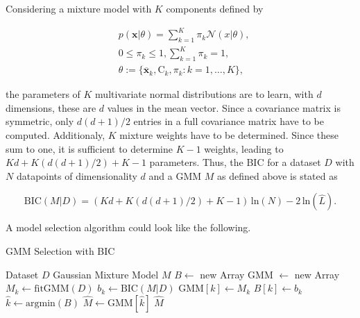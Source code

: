 \documentclass[../../../main.tex]{subfiles}
\begin{document}
Considering a mixture model with $K$ components defined by 

\begin{equation}
    \begin{aligned}
        &p(\bm{x}|\theta) = \sum\limits_{k=1}^K \pi_k \mathcal{N}(x | \theta), \\
        &0 \leq \pi_k \leq 1, \sum\limits_{k=1}^K \pi_k = 1, \\
        &\theta := \{\overline{\bm{x}}_k, \bm{\mathrm{C}}_k, \pi_k : k = 1, \dots, K \},
    \end{aligned}
\end{equation}

the parameters of $K$ multivariate normal distributions are to learn, with $d$ dimensions, these are $d$ values in the mean vector.  Since a covariance matrix is symmetric, only $d(d+1)/2$ entries in a full covariance matrix have to be computed. Additionaly, $K$ mixture weights have to be determined. Since these sum to one, it is sufficient to determine $K-1$ weights, leading to $Kd + K(d(d+1)/2)+K-1$ parameters. Thus, the BIC for a dataset $D$ with $N$ datapoints of dimensionality $d$ and a GMM $M$ as defined above is stated as 

\begin{equation}\label{eq:bic}
    \text{BIC}(M|D) = (Kd + K(d(d+1)/2)+K-1) \, \text{ln}(N) - 2 \, \text{ln}(\hat{L}).
\end{equation}

A model selection algorithm could look like the following.

\begin{algorithm}
    \caption{GMM Selection with BIC}
    \label{alg:gmm_selection_bic}
 
    \begin{algorithmic}[1]
        \REQUIRE Dataset $D$
        \ENSURE Gaussian Mixture Model $M$
        \STATE $B \leftarrow$ new Array
        \STATE GMM $\leftarrow$ new Array
            \STATE $M_k \leftarrow \text{fitGMM}(D)$
            \STATE $b_k \leftarrow \text{BIC}(M|D)$
            \STATE GMM$[k] \leftarrow M_k$
            \STATE $B[k] \leftarrow b_k$
        \ENDFOR
        \STATE $\hat{k} \leftarrow \text{argmin}(B)$
        \STATE $\hat{M} \leftarrow \text{GMM}[\hat{k}]$
        \RETURN $\hat{M}$

        
    \end{algorithmic}
 \end{algorithm}
\end{document}
